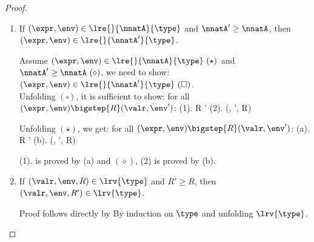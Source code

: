  \begin{proof}
\begin{enumerate} 
   \item If  
   $(\expr, \env) \in  \lre{}{\nnatA}{ \type} $ and $\nnatA' \geq \nnatA$,  then  
   $ (\expr, \env) \in  \lre{}{\nnatA'}{ \type} $.

     Assume $(\expr, \env) \in  \lre{}{\nnatA}{ \type}~(\star)$ and $\nnatA' \geq \nnatA~(\diamond)$, we need to show: $ (\expr, \env) \in  \lre{}{\nnatA'}{ \type}~(\square) $.\\
     Unfolding $(\square)$, it is sufficient to show: 
     for all $(\expr, \env) \bigstep{R} (\valr, \env')$:
     (1). R \leq \nnatA'
     (2). (\valr, \env', R) \in \lrv{\type}

     Unfolding $(\star)$, we get:
     for all $(\expr, \env) \bigstep{R} (\valr, \env')$:
     (a). R \leq \nnatA'
     (b). (\valr, \env', R) \in \lrv{\type}
     
     (1). is proved by (a) and $(\diamond)$, (2) is proved by (b). 


   \item   If  $(
     \valr,\env,  R) \in  \lrv{\type} $ and $R' \geq R$,  then  $ (
     \valr,\env, R') \in  \lrv{\type} $.


     Proof follows directly by By induction on $\type$ and unfolding $\lrv{\type}$.\\




  \end{enumerate}
\end{proof}
